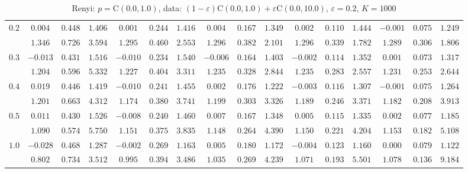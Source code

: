 \begin{table}[ht]
\begin{center}
\begin{tabular}{|c|ccc|ccc|ccc|ccc|ccc|}
\hline 
$0.2$ & $ 0.004 $ & $ 0.448 $ & $ 1.406 $ & $ 0.001 $ & $ 0.244 $ & $ 1.416 $ & $ 0.004 $ & $ 0.167 $ & $ 1.349 $ & $ 0.002 $ & $ 0.110 $ & $ 1.444 $ & $ -0.001 $ & $ 0.075 $ & $ 1.249 $\\ 
 & $ 1.346 $ & $ 0.726 $ & $ 3.594 $ & $ 1.295 $ & $ 0.460 $ & $ 2.553 $ & $ 1.296 $ & $ 0.382 $ & $ 2.101 $ & $ 1.296 $ & $ 0.339 $ & $ 1.782 $ & $ 1.289 $ & $ 0.306 $ & $ 1.806 $\\ 
\hline 
$0.3$ & $ -0.013 $ & $ 0.431 $ & $ 1.516 $ & $ -0.010 $ & $ 0.234 $ & $ 1.540 $ & $ -0.006 $ & $ 0.164 $ & $ 1.403 $ & $ -0.002 $ & $ 0.114 $ & $ 1.352 $ & $ 0.001 $ & $ 0.073 $ & $ 1.317 $\\ 
 & $ 1.204 $ & $ 0.596 $ & $ 5.332 $ & $ 1.227 $ & $ 0.404 $ & $ 3.311 $ & $ 1.235 $ & $ 0.328 $ & $ 2.844 $ & $ 1.235 $ & $ 0.283 $ & $ 2.557 $ & $ 1.231 $ & $ 0.253 $ & $ 2.644 $\\ 
\hline 
$0.4$ & $ 0.019 $ & $ 0.446 $ & $ 1.419 $ & $ -0.010 $ & $ 0.241 $ & $ 1.455 $ & $ 0.002 $ & $ 0.176 $ & $ 1.222 $ & $ -0.003 $ & $ 0.116 $ & $ 1.307 $ & $ -0.001 $ & $ 0.075 $ & $ 1.264 $\\ 
 & $ 1.201 $ & $ 0.663 $ & $ 4.312 $ & $ 1.174 $ & $ 0.380 $ & $ 3.741 $ & $ 1.199 $ & $ 0.303 $ & $ 3.326 $ & $ 1.189 $ & $ 0.246 $ & $ 3.371 $ & $ 1.182 $ & $ 0.208 $ & $ 3.913 $\\ 
\hline 
$0.5$ & $ 0.011 $ & $ 0.430 $ & $ 1.526 $ & $ -0.008 $ & $ 0.240 $ & $ 1.460 $ & $ 0.007 $ & $ 0.167 $ & $ 1.348 $ & $ 0.005 $ & $ 0.115 $ & $ 1.335 $ & $ 0.002 $ & $ 0.077 $ & $ 1.185 $\\ 
 & $ 1.090 $ & $ 0.574 $ & $ 5.750 $ & $ 1.151 $ & $ 0.375 $ & $ 3.835 $ & $ 1.148 $ & $ 0.264 $ & $ 4.390 $ & $ 1.150 $ & $ 0.221 $ & $ 4.204 $ & $ 1.153 $ & $ 0.182 $ & $ 5.108 $\\ 
\hline 
$1.0$ & $ -0.028 $ & $ 0.468 $ & $ 1.287 $ & $ -0.002 $ & $ 0.269 $ & $ 1.163 $ & $ 0.005 $ & $ 0.180 $ & $ 1.172 $ & $ -0.004 $ & $ 0.123 $ & $ 1.160 $ & $ 0.000 $ & $ 0.079 $ & $ 1.122 $\\ 
 & $ 0.802 $ & $ 0.734 $ & $ 3.512 $ & $ 0.995 $ & $ 0.394 $ & $ 3.486 $ & $ 1.035 $ & $ 0.269 $ & $ 4.239 $ & $ 1.071 $ & $ 0.193 $ & $ 5.501 $ & $ 1.078 $ & $ 0.136 $ & $ 9.184 $\\ 
\hline 
\end{tabular}
\caption{Renyi: $p = \mathrm{C}(0.0,1.0)$, data: $(1-\varepsilon)\mathrm{C}(0.0,1.0) + \varepsilon \mathrm{C}(0.0,10.0)$, $\varepsilon =  0.2$, $K = 1000$} 
\end{center}
\end{table}

